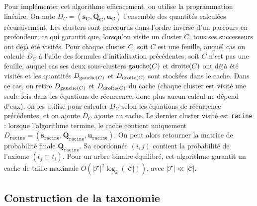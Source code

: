 Pour implémenter cet algorithme efficacement, on utilise la programmation linéaire. On note $D_C = (\mathbf{s_C}, \mathbf{Q_C}, \mathbf{u_C})$ l'ensemble des quantités calculées récursivement. Les clusters sont parcourus dans l'ordre inverse d'un parcours en profondeur, ce qui garantit que, lorsqu'on visite un cluster $C$, tous ses successeurs ont déjà été visités. Pour chaque cluster $C$, soit $C$ est une feuille, auquel cas on calcule $D_C$ à l'aide des formules d'initialisation précédentes; soit $C$ n'est pas une feuille, auquel cas ses deux sous-clusters $\operatorname{gauche}(C)$ et $\operatorname{droite}(C)$ ont déjà été visités et les quantités $D_{\operatorname{gauche}(C)}$ et $D_{\operatorname{droite}(C)}$ sont stockées dans le cache. Dans ce cas, on retire $D_{\operatorname{gauche}(C)}$ et $D_{\operatorname{droite}(C)}$ du cache (chaque cluster est visité une seule fois dans les équations de récurrence, donc plus aucun calcul ne dépend d'eux), on les utilise pour calculer $D_C$ selon les équations de récurrence précédentes, et on ajoute $D_C$ ajoute au cache. Le dernier cluster visité est \texttt{racine} : lorsque l'algorithme termine, le cache contient uniquement $D_\texttt{racine} = (\mathbf{s_\texttt{racine}}, \mathbf{Q_\texttt{racine}}, \mathbf{u_\texttt{racine}})$. On peut alors retourner la matrice de probabilité finale $\mathbf{Q_\texttt{racine}}$. Sa coordonnée $(i, j)$ contient la probabilité de l'axiome $(t_j \sqsubset t_i)$.
Pour un arbre binaire équilibré, cet algorithme garantit un cache de taille maximale $O(|\mathcal{T}|^2 \log_2(| \mathcal{C} |))$, avec $|\mathcal{T}| \ll | \mathcal{C} |$.


\subsection{Construction de la taxonomie}
\label{subsec:te-taxconstruction}

